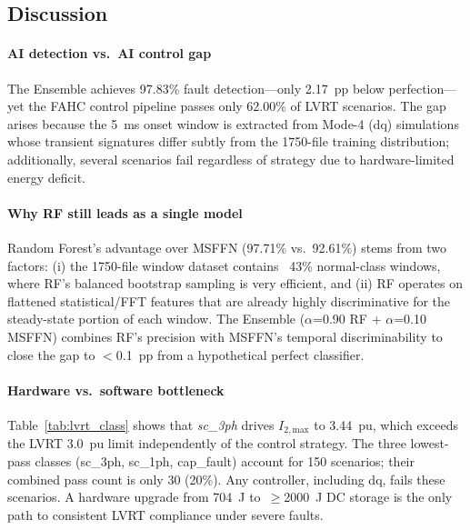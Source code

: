 \subsection{Discussion}
\label{sec:discussion}

\paragraph{AI detection vs.\ AI control gap}
The Ensemble achieves 97.83\% fault detection—only 2.17~pp
below perfection—yet the FAHC control pipeline passes only
62.00\% of LVRT scenarios.
The gap arises because the 5~ms onset window is extracted
from Mode-4 (dq) simulations whose transient signatures
differ subtly from the 1750-file training distribution;
additionally, several scenarios fail regardless of strategy
due to hardware-limited energy deficit.

\paragraph{Why RF still leads as a single model}
Random Forest's advantage over MSFFN (97.71\% vs.\ 92.61\%)
stems from two factors:
(i) the 1750-file window dataset contains ~43\% normal-class
windows, where RF's balanced bootstrap sampling is very efficient,
and (ii) RF operates on flattened statistical/FFT features
that are already highly discriminative for the steady-state
portion of each window.
The Ensemble ($\alpha$=0.90 RF + $\alpha$=0.10 MSFFN) combines
RF's precision with MSFFN's temporal discriminability to
close the gap to $<$0.1~pp from a hypothetical perfect classifier.

\paragraph{Hardware vs.\ software bottleneck}
Table~\ref{tab:lvrt_class} shows that \textit{sc\_3ph}
drives $I_{2,\text{max}}$ to 3.44~pu, which exceeds the
LVRT 3.0~pu limit independently of the control strategy.
The three lowest-pass classes (sc\_3ph, sc\_1ph, cap\_fault)
account for 150 scenarios; their combined pass count is only
30 (20\%).
Any controller, including dq, fails these scenarios.
A hardware upgrade from 704~J to~$\geq$2000~J DC storage
is the only path to consistent LVRT compliance under severe faults.
